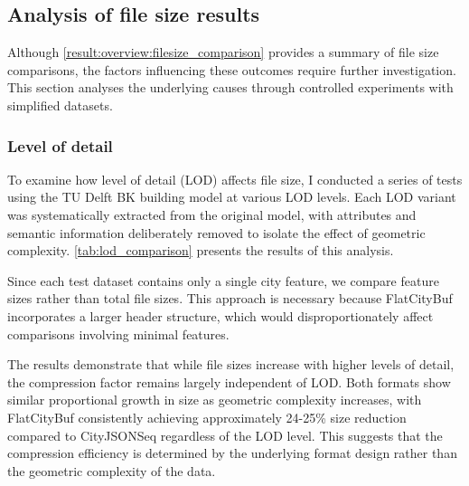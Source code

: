 \subsection{Analysis of file size results}
\label{result:overview:analysis_of_file_size_results}
Although \autoref{result:overview:filesize_comparison} provides a summary of file size comparisons, the factors influencing these outcomes require further investigation. This section analyses the underlying causes through controlled experiments with simplified datasets.

\subsubsection{Level of detail}
\label{result:overview:analysis_of_file_size_results:level_of_detail}

To examine how level of detail (LOD) affects file size, I conducted a series of tests using the TU Delft BK building model at various LOD levels. Each LOD variant was systematically extracted from the original model, with attributes and semantic information deliberately removed to isolate the effect of geometric complexity. \autoref{tab:lod_comparison} presents the results of this analysis.

Since each test dataset contains only a single city feature, we compare feature sizes rather than total file sizes. This approach is necessary because FlatCityBuf incorporates a larger header structure, which would disproportionately affect comparisons involving minimal features.

The results demonstrate that while file sizes increase with higher levels of detail, the compression factor remains largely independent of LOD. Both formats show similar proportional growth in size as geometric complexity increases, with FlatCityBuf consistently achieving approximately 24-25\% size reduction compared to CityJSONSeq regardless of the LOD level. This suggests that the compression efficiency is determined by the underlying format design rather than the geometric complexity of the data.

